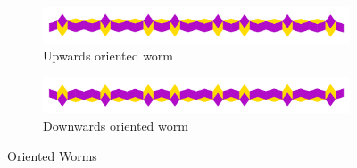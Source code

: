\documentclass[
  oneside,
  11pt, a4paper,
  footinclude=true,
  headinclude=true,
  cleardoublepage=empty
]{scrbook}
\begin{document}
\begin{figure}[h]
\centering
\begin{subfigure}{\textwidth}
\centering
\includegraphics[width=\textwidth]{reWorm}
\caption{Upwards oriented worm}
\end{subfigure}

\begin{subfigure}{\textwidth}
\centering
\includegraphics[width=\textwidth]{reWormDown}
\caption{Downwards oriented worm}
\end{subfigure}

\caption{Oriented Worms}
\label{fig:worm}
\end{figure}
\end{document}
